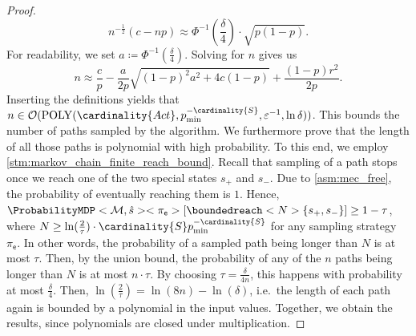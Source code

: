 \documentclass{theoretics}
\newcommand{\MDP}{\mathcal{M}}
\newcommand{\States}{S}
\newcommand{\initialstate}{\hat{s}}
\newcommand{\Actions}{Act}
\newcommand{\strategy}{\pi}
\newcommand{\targetstate}{s_+}
\newcommand{\sinkstate}{s_-}
\newcommand{\algoepisode}{\mathsf{e}}
\begin{document}
\begin{proof}
\begin{equation*}
		n^{-\frac{1}{2}} (c - np) \approx \Phi^{-1}\left( \frac{\delta}{4} \right) \cdot \sqrt{p (1 - p)}.
	\end{equation*}
	For readability, we set $a \coloneqq \Phi^{-1}\left( \frac{\delta}{4} \right)$.
	Solving for $n$ gives us
	\begin{equation*}
		n \approx \frac{c}{p} - \frac{a}{2p} \sqrt{(1-p)^2 a^2 + 4 c (1 - p)} + \frac{(1 - p) r^2}{2p}.
	\end{equation*}
	Inserting the definitions yields that $n \in \mathcal{O}(\mathrm{POLY}(\cardinality{\Actions}, p_{\min}^{-\cardinality{\States}}, \varepsilon^{-1}, \ln \delta))$.
	This bounds the number of paths sampled by the algorithm.
	We furthermore prove that the length of all those paths is polynomial with high probability.
	To this end, we employ \cref{stm:markov_chain_finite_reach_bound}.
	Recall that sampling of a path stops once we reach one of the two special states $\targetstate$ and $\sinkstate$.
	Due to \cref{asm:mec_free}, the probability of eventually reaching them is $1$.
	Hence, $\ProbabilityMDP<\MDP, \initialstate><\strategy_\algoepisode>[\boundedreach<N> \{\targetstate, \sinkstate\}] \geq 1 - \tau$, where $N \geq \ln(\frac{2}{\tau}) \cdot \cardinality{\States} p_{\min}^{-\cardinality{\States}}$ for any sampling strategy $\strategy_\algoepisode$.
	In other words, the probability of a sampled path being longer than $N$ is at most $\tau$.
	Then, by the union bound, the probability of any of the $n$ paths being longer than $N$ is at most $n \cdot \tau$.
	By choosing $\tau = \frac{\delta}{4 n}$, this happens with probability at most $\frac{\delta}{4}$.
	Then, $\ln(\frac{2}{\tau}) = \ln(8 n) - \ln(\delta)$, i.e.\ the length of each path again is bounded by a polynomial in the input values.
	Together, we obtain the results, since polynomials are closed under multiplication. 
\end{proof}
\end{document}
